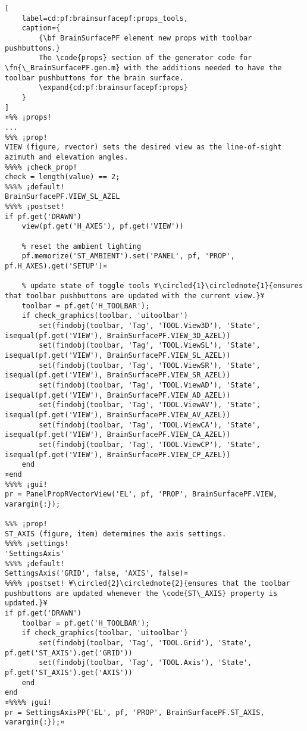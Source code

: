 \documentclass{tufte-handout}
\begin{document}
\begin{lstlisting}[
	label=cd:pf:brainsurfacepf:props_tools,
	caption={
		{\bf BrainSurfacePF element new props with toolbar pushbuttons.}
		The \code{props} section of the generator code for \fn{\_BrainSurfacePF.gen.m} with the additions needed to have the toolbar pushbuttons for the brain surface.
		\expand{cd:pf:brainsurfacepf:props}
	}
]
¤%% ¡props!
...
%%% ¡prop!
VIEW (figure, rvector) sets the desired view as the line-of-sight azimuth and elevation angles.
%%%% ¡check_prop!
check = length(value) == 2;
%%%% ¡default!
BrainSurfacePF.VIEW_SL_AZEL
%%%% ¡postset!
if pf.get('DRAWN')
    view(pf.get('H_AXES'), pf.get('VIEW'))
    
    % reset the ambient lighting
    pf.memorize('ST_AMBIENT').set('PANEL', pf, 'PROP', pf.H_AXES).get('SETUP')¤
    
    % update state of toggle tools ¥\circled{1}\circlednote{1}{ensures that toolbar pushbuttons are updated with the current view.}¥
    toolbar = pf.get('H_TOOLBAR');
    if check_graphics(toolbar, 'uitoolbar')
        set(findobj(toolbar, 'Tag', 'TOOL.View3D'), 'State', isequal(pf.get('VIEW'), BrainSurfacePF.VIEW_3D_AZEL))
        set(findobj(toolbar, 'Tag', 'TOOL.ViewSL'), 'State', isequal(pf.get('VIEW'), BrainSurfacePF.VIEW_SL_AZEL))
        set(findobj(toolbar, 'Tag', 'TOOL.ViewSR'), 'State', isequal(pf.get('VIEW'), BrainSurfacePF.VIEW_SR_AZEL))
        set(findobj(toolbar, 'Tag', 'TOOL.ViewAD'), 'State', isequal(pf.get('VIEW'), BrainSurfacePF.VIEW_AD_AZEL))
        set(findobj(toolbar, 'Tag', 'TOOL.ViewAV'), 'State', isequal(pf.get('VIEW'), BrainSurfacePF.VIEW_AV_AZEL))
        set(findobj(toolbar, 'Tag', 'TOOL.ViewCA'), 'State', isequal(pf.get('VIEW'), BrainSurfacePF.VIEW_CA_AZEL))
        set(findobj(toolbar, 'Tag', 'TOOL.ViewCP'), 'State', isequal(pf.get('VIEW'), BrainSurfacePF.VIEW_CP_AZEL))
    end
¤end
%%%% ¡gui!
pr = PanelPropRVectorView('EL', pf, 'PROP', BrainSurfacePF.VIEW, varargin{:});

%%% ¡prop!
ST_AXIS (figure, item) determines the axis settings.
%%%% ¡settings!
'SettingsAxis'
%%%% ¡default!
SettingsAxis('GRID', false, 'AXIS', false)¤
%%%% ¡postset! ¥\circled{2}\circlednote{2}{ensures that the toolbar pushbuttons are updated whenever the \code{ST\_AXIS} property is updated.}¥
if pf.get('DRAWN')
    toolbar = pf.get('H_TOOLBAR');
    if check_graphics(toolbar, 'uitoolbar')
        set(findobj(toolbar, 'Tag', 'TOOL.Grid'), 'State', pf.get('ST_AXIS').get('GRID'))
        set(findobj(toolbar, 'Tag', 'TOOL.Axis'), 'State', pf.get('ST_AXIS').get('AXIS'))
    end
end
¤%%%% ¡gui!
pr = SettingsAxisPP('EL', pf, 'PROP', BrainSurfacePF.ST_AXIS, varargin{:});¤


\end{lstlisting}
\end{document}
